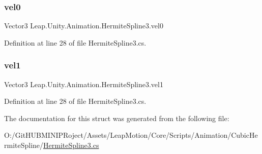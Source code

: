 \subsubsection{\texorpdfstring{vel0}{vel0}}
{\footnotesize\ttfamily Vector3 Leap.\+Unity.\+Animation.\+Hermite\+Spline3.\+vel0}



Definition at line 28 of file Hermite\+Spline3.\+cs.

\mbox{\label{struct_leap_1_1_unity_1_1_animation_1_1_hermite_spline3_ab77b29135690ffc6f3671418100be381}} 
\subsubsection{\texorpdfstring{vel1}{vel1}}
{\footnotesize\ttfamily Vector3 Leap.\+Unity.\+Animation.\+Hermite\+Spline3.\+vel1}



Definition at line 28 of file Hermite\+Spline3.\+cs.



The documentation for this struct was generated from the following file\+:\begin{DoxyCompactItemize}
\item 
O\+:/\+Git\+H\+U\+B\+M\+I\+N\+I\+P\+Roject/\+Assets/\+Leap\+Motion/\+Core/\+Scripts/\+Animation/\+Cubic\+Hermite\+Spline/\mbox{\hyperlink{_hermite_spline3_8cs}{Hermite\+Spline3.\+cs}}\end{DoxyCompactItemize}
